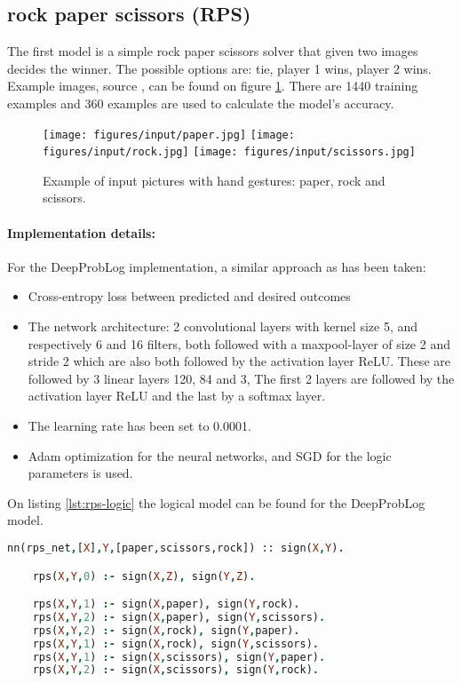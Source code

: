 \subsection{rock paper scissors (RPS)}
The first model is a simple rock paper scissors solver that given two images decides the winner. The possible options are: tie, player 1 wins, player 2 wins. Example images, source \cite{RPSLS-database}, can be found on figure \ref{fig:rps_input}. There are 1440 training examples and 360 examples are used to calculate the model's accuracy. 

\begin{figure}[htp]
    \centering
    \texttt{[image: figures/input/paper.jpg]}\hfill
    \texttt{[image: figures/input/rock.jpg]}\hfill
    \texttt{[image: figures/input/scissors.jpg]}
    \caption{Example of input pictures with hand gestures: paper, rock and scissors\cite{RPSLS-database}.} %
    \label{fig:rps_input}
\end{figure}

\paragraph{Implementation details:} For the DeepProbLog implementation, a similar approach as \cite{DBLP} has been taken:
\begin{itemize}
    \item Cross-entropy loss between predicted and desired outcomes
    \item The network architecture: 2 convolutional layers with kernel size 5, and respectively 6 and 16 filters, both followed with a maxpool-layer of size 2 and stride 2 which are also both followed by the activation layer ReLU. These are followed by 3 linear layers 120, 84 and 3, The first 2 layers are followed by the activation layer ReLU and the last by a softmax layer. \item The learning rate has been set to 0.0001. 
    \item Adam \cite{kingma2014adam} optimization for the neural networks, and SGD for the logic parameters is used.
  \end{itemize}
  On listing \ref{lst:rps-logic} the logical model can be found for the DeepProbLog model.

  \begin{lstlisting}[label={lst:rps-logic},language=Prolog,frame=single,caption={Rock paper scissors DeepProbLog model},captionpos=b]
    nn(rps_net,[X],Y,[paper,scissors,rock]) :: sign(X,Y).

    rps(X,Y,0) :- sign(X,Z), sign(Y,Z).

    rps(X,Y,1) :- sign(X,paper), sign(Y,rock).
    rps(X,Y,2) :- sign(X,paper), sign(Y,scissors).
    rps(X,Y,2) :- sign(X,rock), sign(Y,paper).
    rps(X,Y,1) :- sign(X,rock), sign(Y,scissors).
    rps(X,Y,1) :- sign(X,scissors), sign(Y,paper).
    rps(X,Y,2) :- sign(X,scissors), sign(Y,rock).
    \end{lstlisting}

